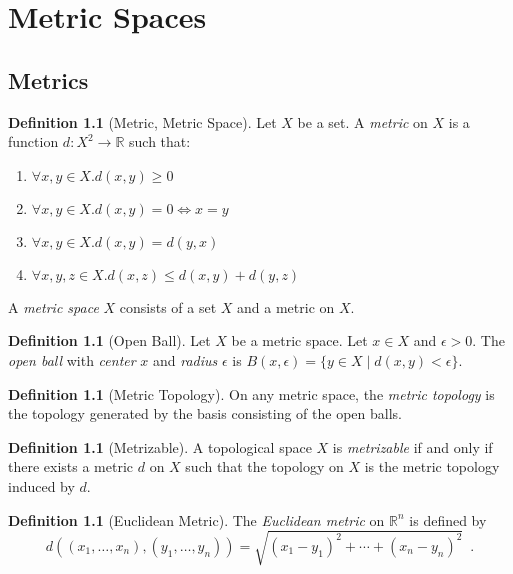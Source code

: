 \documentclass{book}
\theoremstyle{definition}
\newtheorem{definition}[lemma]{Definition}
\newcommand{\Real}{\ensuremath{\mathbb{R}}}
\begin{document}
\chapter{Metric Spaces}

\section{Metrics}

\begin{definition}[Metric, Metric Space]
    Let $X$ be a set. A \emph{metric} on $X$ is a function $d : X^2 \rightarrow \Real$ such that:
    \begin{enumerate}
        \item $\forall x,y \in X. d(x,y) \geq 0$
        \item $\forall x,y \in X. d(x,y) = 0 \Leftrightarrow x = y$
        \item $\forall x,y \in X. d(x,y) = d(y,x)$
        \item $\forall x,y,z \in X. d(x,z) \leq d(x,y) + d(y,z)$
    \end{enumerate}

    A \emph{metric space} $X$ consists of a set $X$ and a metric on $X$.
\end{definition}

\begin{definition}[Open Ball]
    Let $X$ be a metric space. Let $x \in X$ and $\epsilon > 0$. The \emph{open ball} with \emph{center} $x$
    and \emph{radius} $\epsilon$ is $B(x, \epsilon) = \{ y \in X \mid d(x,y) < \epsilon \}$.
\end{definition}

\begin{definition}[Metric Topology]
    On any metric space, the \emph{metric topology} is the topology generated by the basis consisting of the open balls.
\end{definition}

\begin{definition}[Metrizable]
    A topological space $X$ is \emph{metrizable} if and only if there exists a metric $d$ on $X$ such that the topology on $X$
    is the metric topology induced by $d$.
\end{definition}

\begin{definition}[Euclidean Metric]
    The \emph{Euclidean metric} on $\Real^n$ is defined by
    \[ d((x_1, \ldots, x_n),(y_1, \ldots, y_n)) = \sqrt{(x_1 - y_1)^2 + \cdots + (x_n - y_n)^2} \enspace . \]
\end{definition}
\end{document}
